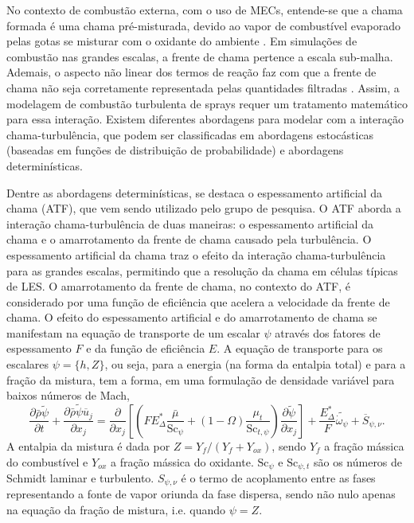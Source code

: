 No contexto de combustão externa, com o uso de MECs, entende-se que a chama formada é uma chama pré-misturada, devido ao vapor de combustível evaporado pelas gotas se misturar com o oxidante do ambiente \cite{PoinsotVeynante2005}.
Em simulações de combustão nas grandes escalas, a frente de chama pertence a escala sub-malha.
Ademais, o aspecto não linear dos termos de reação faz com que a frente de chama não seja corretamente representada pelas quantidades filtradas \cite{SacomanoF2017PhD}.
Assim, a modelagem de combustão turbulenta de sprays requer um tratamento matemático para essa interação.
Existem diferentes abordagens para modelar com a interação chama-turbulência, que podem ser classificadas em abordagens estocásticas (baseadas em funções de distribuição de probabilidade) e abordagens determinísticas.

Dentre as abordagens determinísticas, se destaca o espessamento artificial da chama (ATF), que vem sendo utilizado pelo grupo de pesquisa.
O ATF aborda a interação chama-turbulência de duas maneiras: o espessamento artificial da chama e o amarrotamento da frente de chama causado pela turbulência.
O espessamento artificial da chama traz o efeito da interação chama-turbulência para as grandes escalas, permitindo que a resolução da chama em células típicas de LES.
O amarrotamento da frente de chama, no contexto do ATF, é considerado por uma função de eficiência que acelera a velocidade da frente de chama.
O efeito do espessamento artificial e do amarrotamento de chama se manifestam na equação de transporte de um escalar $\psi$ através dos fatores de espessamento $F$ e da função de eficiência $E$.
A equação de transporte para os escalares  $\psi=\lbrace h, Z\rbrace$, ou seja, para a energia (na forma da entalpia total) e para a fração da mistura, tem a forma, em uma formulação de densidade variável para baixos números de Mach,
\begin{equation}
    \frac{\partial \bar \rho \widetilde \psi}{\partial t} + 
    \frac{\partial \bar \rho \widetilde \psi \overline u_j}{\partial x_j} =
    \frac{\partial }{\partial x_j} \left[ \left(
    FE^*_\Delta \frac{\bar\mu}{\text{Sc}_\psi} + (1-\Omega)\frac{\mu_t}{\text{Sc}_{t,\psi}}
    \right) \frac{\partial \widetilde \psi}{\partial x_j}
    \right] +
    \frac{E^*_\Delta}{F}\widetilde{\dot{\omega}_\psi} + 
    \overline S_{\psi,\nu}.
    \label{eq:FGM}
\end{equation}
A entalpia da mistura é dada por $Z=Y_f/{(Y_f+Y_{ox})}$, sendo $Y_f$ a fração mássica do combustível e $Y_{ox}$ a fração mássica do oxidante.
$\text{Sc}_{\psi}$ e $\text{Sc}_{\psi,t}$ são os números de Schmidt laminar e turbulento.
$S_{\psi,\nu}$ é o termo de acoplamento entre as fases representando a fonte de vapor oriunda da fase dispersa, sendo não nulo apenas na equação da fração de mistura, i.e. quando $\psi=Z$.

